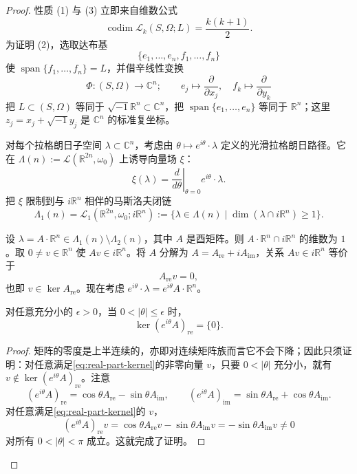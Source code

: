 \begin{proof}
性质 (1) 与 (3) 立即来自维数公式
\[
 \operatorname{codim}\mathcal L_k(S,\Omega;L)=\frac{k(k+1)}2.
\]
为证明 (2)，选取达布基
\[
 \{e_1,\ldots,e_n,f_1,\ldots,f_n\}
\]
使 $\operatorname{span}\{f_1,\ldots,f_n\}=L$，并借辛线性变换
\[
 \Phi:(S,\Omega)\longrightarrow\mathbb C^n;\qquad
 e_j\longmapsto\frac{\partial}{\partial x_j},\quad
 f_k\longmapsto\frac{\partial}{\partial y_k}
\]
把 $L\subset(S,\Omega)$ 等同于 $\sqrt{-1}\mathbb R^n\subset\mathbb C^n$，把
$\operatorname{span}\{e_1,\ldots,e_n\}$ 等同于 $\mathbb R^n$；这里
$z_j=x_j+\sqrt{-1}y_j$ 是 $\mathbb C^n$ 的标准复坐标。

对每个拉格朗日子空间 $\lambda\subset\mathbb C^n$，考虑由
$\theta\mapsto e^{i\theta}\cdot\lambda$ 定义的光滑拉格朗日路径。它在
$\Lambda(n):=\mathcal L(\mathbb R^{2n},\omega_0)$ 上诱导向量场 $\xi$：
\[
 \xi(\lambda)=\left.\frac d{d\theta}\right|_{\theta=0}e^{i\theta}\cdot\lambda.
\]
把 $\xi$ 限制到与 $i\mathbb R^n$ 相伴的马斯洛夫闭链
\[
 \Lambda_1(n)=\mathcal L_1(\mathbb R^{2n},\omega_0;i\mathbb R^n)
 :=\{\lambda\in\Lambda(n)\mid\dim(\lambda\cap i\mathbb R^n)\ge1\}.
\]

设 $\lambda=A\cdot\mathbb R^n\in\Lambda_1(n)\setminus\Lambda_2(n)$，其中 $A$ 是酉矩阵。则 $A\cdot\mathbb R^n\cap i\mathbb R^n$ 的维数为 $1$。取
$0\ne v\in\mathbb R^n$ 使 $Av\in i\mathbb R^n$。将 $A$ 分解为
$A=A_{\mathrm{re}}+iA_{\mathrm{im}}$，关系 $Av\in i\mathbb R^n$ 等价于
\begin{equation}
 A_{\mathrm{re}}v=0,
 \label{eq:real-part-kernel}
\end{equation}
也即 $v\in\ker A_{\mathrm{re}}$。现在考虑
$e^{i\theta}\cdot\lambda=e^{i\theta}A\cdot\mathbb R^n$。

\begin{lemma}\label{lem:rotated-real-part-kernel}
对任意充分小的 $\epsilon>0$，当 $0<|\theta|\le\epsilon$ 时，
\[
 \ker(e^{i\theta}A)_{\mathrm{re}}=\{0\}.
\]
\end{lemma}

\begin{proof}
矩阵的零度是上半连续的，亦即对连续矩阵族而言它不会下降；因此只须证明：对任意满足\eqref{eq:real-part-kernel}的非零向量 $v$，只要 $0<|\theta|$ 充分小，就有
$v\notin\ker(e^{i\theta}A)_{\mathrm{re}}$。注意
\[
 (e^{i\theta}A)_{\mathrm{re}}
 =\cos\theta A_{\mathrm{re}}-\sin\theta A_{\mathrm{im}},\qquad
 (e^{i\theta}A)_{\mathrm{im}}
 =\sin\theta A_{\mathrm{re}}+\cos\theta A_{\mathrm{im}}.
\]
对任意满足\eqref{eq:real-part-kernel}的 $v$，
\[
 (e^{i\theta}A)_{\mathrm{re}}v
 =\cos\theta A_{\mathrm{re}}v-\sin\theta A_{\mathrm{im}}v
 =-\sin\theta A_{\mathrm{im}}v\ne0
\]
对所有 $0<|\theta|<\pi$ 成立。这就完成了证明。
\end{proof}


\end{proof}
